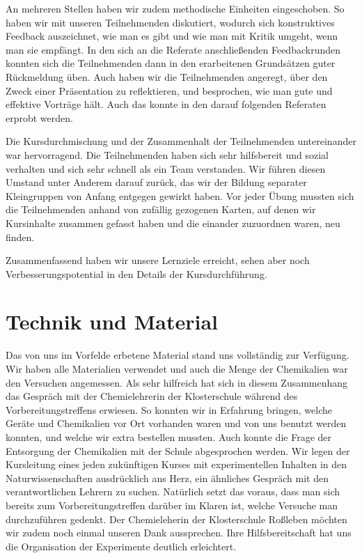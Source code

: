 \documentclass{scrartcl}
\begin{document}
An mehreren Stellen haben wir zudem methodische Einheiten eingeschoben. So haben wir mit unseren Teilnehmenden diskutiert, wodurch sich konstruktives Feedback auszeichnet, wie man es gibt und wie man mit Kritik umgeht, wenn man sie empf{\"a}ngt. In den sich an die Referate anschlie{\ss}enden Feedbackrunden konnten sich die Teilnehmenden dann in den erarbeitenen Grunds{\"a}tzen guter R{\"u}ckmeldung {\"u}ben. Auch haben wir die Teilnehmenden angeregt, {\"u}ber den Zweck einer Pr{\"a}sentation zu reflektieren, und besprochen, wie man gute und effektive Vortr{\"a}ge h{\"a}lt. Auch das konnte in den darauf folgenden Referaten erprobt werden.\medskip

Die Kursdurchmischung und der Zusammenhalt der Teilnehmenden untereinander war hervorragend. Die Teilnehmenden haben sich sehr hilfsbereit und sozial verhalten und sich sehr schnell als ein Team verstanden. Wir f{\"u}hren diesen Umstand unter Anderem darauf zur{\"u}ck, das wir der Bildung separater Kleingruppen von Anfang entgegen gewirkt haben. Vor jeder {\"U}bung mussten sich die Teilnehmenden anhand von zuf{\"a}llig gezogenen Karten, auf denen wir Kursinhalte zusammen gefasst haben und die einander zuzuordnen waren, neu finden.\medskip

Zusammenfassend haben wir unsere Lernziele erreicht, sehen aber noch Verbesserungspotential in den Details der Kursdurchf{\"u}hrung.\bigskip

\section*{Technik und Material}

Das von uns im Vorfelde erbetene Material stand uns vollst{\"a}ndig zur Verf{\"u}gung. Wir haben alle Materialien verwendet und auch die Menge der Chemikalien war den Versuchen angemessen. Als sehr hilfreich hat sich in diesem Zusammenhang das Gespr{\"a}ch mit der Chemielehrerin der Klosterschule w{\"a}hrend des Vorbereitungstreffens erwiesen. So konnten wir in Erfahrung bringen, welche Ger{\"a}te und Chemikalien vor Ort vorhanden waren und von uns benutzt werden konnten, und welche wir extra bestellen mussten. Auch konnte die Frage der Entsorgung der Chemikalien mit der Schule abgesprochen werden. Wir legen der Kursleitung eines jeden zuk{\"u}nftigen Kurses mit experimentellen Inhalten in den Naturwissenschaften ausdr{\"u}cklich ans Herz, ein {\"a}hnliches Gespr{\"a}ch mit den verantwortlichen Lehrern zu suchen. Nat{\"u}rlich setzt das voraus, dass man sich bereits zum Vorbereitungstreffen dar{\"u}ber im Klaren ist, welche Versuche man durchzuf{\"u}hren gedenkt. Der Chemieleherin der Klosterschule Ro{\ss}leben m{\"o}chten wir zudem noch einmal unseren Dank aussprechen. Ihre Hilfsbereitschaft hat uns die Organisation der Experimente deutlich erleichtert.\medskip
\end{document}
